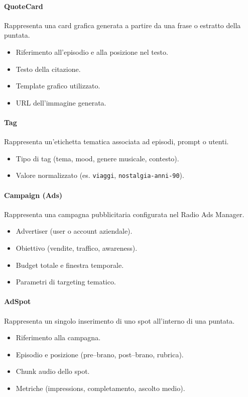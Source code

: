 \documentclass[11pt,a4paper]{article}
\begin{document}
\paragraph{QuoteCard}
Rappresenta una card grafica generata a partire da una frase o estratto della puntata.
\begin{itemize}
    \item Riferimento all’episodio e alla posizione nel testo.
    \item Testo della citazione.
    \item Template grafico utilizzato.
    \item URL dell’immagine generata.
\end{itemize}

\paragraph{Tag}
Rappresenta un’etichetta tematica associata ad episodi, prompt o utenti.
\begin{itemize}
    \item Tipo di tag (tema, mood, genere musicale, contesto).
    \item Valore normalizzato (es. \texttt{viaggi}, \texttt{nostalgia-anni-90}).
\end{itemize}

\paragraph{Campaign (Ads)}
Rappresenta una campagna pubblicitaria configurata nel Radio Ads Manager.
\begin{itemize}
    \item Advertiser (user o account aziendale).
    \item Obiettivo (vendite, traffico, awareness).
    \item Budget totale e finestra temporale.
    \item Parametri di targeting tematico.
\end{itemize}

\paragraph{AdSpot}
Rappresenta un singolo inserimento di uno spot all’interno di una puntata.
\begin{itemize}
    \item Riferimento alla campagna.
    \item Episodio e posizione (pre–brano, post–brano, rubrica).
    \item Chunk audio dello spot.
    \item Metriche (impressions, completamento, ascolto medio).
\end{itemize}
\end{document}
